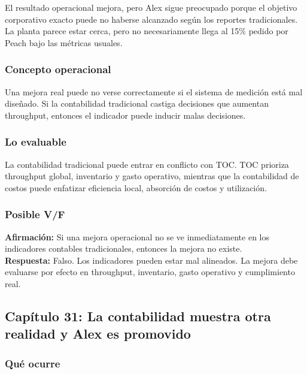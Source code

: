 \documentclass[
  11pt,
]{article}
\begin{document}
El resultado operacional mejora, pero Alex sigue preocupado porque el
objetivo corporativo exacto puede no haberse alcanzado según los
reportes tradicionales. La planta parece estar cerca, pero no
necesariamente llega al 15\% pedido por Peach bajo las métricas usuales.

\hypertarget{concepto-operacional-3}{%
\subsubsection{Concepto operacional}\label{concepto-operacional-3}}

Una mejora real puede no verse correctamente si el sistema de medición
está mal diseñado. Si la contabilidad tradicional castiga decisiones que
aumentan throughput, entonces el indicador puede inducir malas
decisiones.

\hypertarget{lo-evaluable-3}{%
\subsubsection{Lo evaluable}\label{lo-evaluable-3}}

La contabilidad tradicional puede entrar en conflicto con TOC. TOC
prioriza throughput global, inventario y gasto operativo, mientras que
la contabilidad de costos puede enfatizar eficiencia local, absorción de
costos y utilización.

\hypertarget{posible-vf-3}{%
\subsubsection{Posible V/F}\label{posible-vf-3}}

\textbf{Afirmación:} Si una mejora operacional no se ve inmediatamente
en los indicadores contables tradicionales, entonces la mejora no
existe.\\
\textbf{Respuesta:} Falso. Los indicadores pueden estar mal alineados.
La mejora debe evaluarse por efecto en throughput, inventario, gasto
operativo y cumplimiento real.

\hypertarget{capuxedtulo-31-la-contabilidad-muestra-otra-realidad-y-alex-es-promovido}{%
\subsection{Capítulo 31: La contabilidad muestra otra realidad y Alex es
promovido}\label{capuxedtulo-31-la-contabilidad-muestra-otra-realidad-y-alex-es-promovido}}

\hypertarget{quuxe9-ocurre-4}{%
\subsubsection{Qué ocurre}\label{quuxe9-ocurre-4}}
\end{document}
